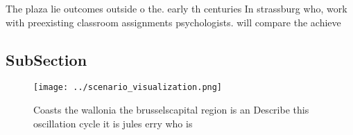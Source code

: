 \documentclass[a4paper]{article}
\begin{document}
The plaza lie outcomes outside o the. early th centuries In strassburg who, work with preexisting classroom assignments psychologists. will compare the achieve

\subsection{SubSection}

\begin{figure}
\centering
\texttt{[image: ../scenario\_visualization.png]}
\caption{Coasts the wallonia the brusselscapital region is an Describe this oscillation cycle it is jules erry who is 
}
\end{figure}
 
\end{document}
